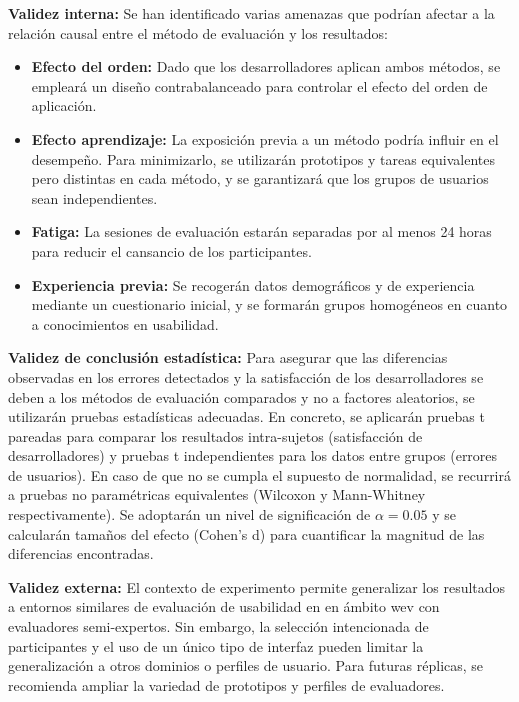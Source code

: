 \documentclass[a4paper,12pt]{report}
\begin{document}
\textbf{Validez interna:} Se han identificado varias amenazas que podrían afectar a la relación causal entre el método 
de evaluación y los resultados: 
\begin{itemize}
    \item \textbf{Efecto del orden:} Dado que los desarrolladores aplican ambos métodos, se empleará un diseño contrabalanceado para controlar el efecto del orden de aplicación.
    \item \textbf{Efecto aprendizaje:} La exposición previa a un método podría influir en el desempeño. Para minimizarlo, se utilizarán prototipos y tareas equivalentes pero distintas en cada método, y se garantizará que los grupos de usuarios sean independientes.
    \item \textbf{Fatiga:} La sesiones de evaluación estarán separadas por al menos 24 horas para reducir el cansancio de los participantes. 
    \item \textbf{Experiencia previa:} Se recogerán datos demográficos y de experiencia mediante un cuestionario inicial, y se formarán grupos homogéneos en cuanto a conocimientos en usabilidad.
\end{itemize}

\textbf{Validez de conclusión estadística:} Para asegurar que las diferencias observadas en los errores detectados y la 
satisfacción de los desarrolladores se deben a los métodos de evaluación comparados y no a factores aleatorios, 
se utilizarán pruebas estadísticas adecuadas. En concreto, se aplicarán pruebas t pareadas para comparar los resultados intra-sujetos (satisfacción de 
desarrolladores) y pruebas t independientes para los datos entre grupos (errores de usuarios). En caso de que no se cumpla el 
supuesto de normalidad, se recurrirá a pruebas no paramétricas equivalentes (Wilcoxon y Mann-Whitney respectivamente).
Se adoptarán un nivel de significación de $\alpha=0.05$ y se calcularán tamaños del efecto (Cohen’s d) para cuantificar la magnitud de las diferencias encontradas.

\textbf{Validez externa:} El contexto de experimento permite generalizar los resultados a entornos similares de evaluación de usabilidad en en ámbito wev con evaluadores semi-expertos. Sin embargo, la selección 
intencionada de participantes y el uso de un único tipo de interfaz pueden limitar la generalización a otros dominios o perfiles de usuario. Para futuras réplicas, se recomienda ampliar la variedad de prototipos y perfiles de evaluadores.
\end{document}
